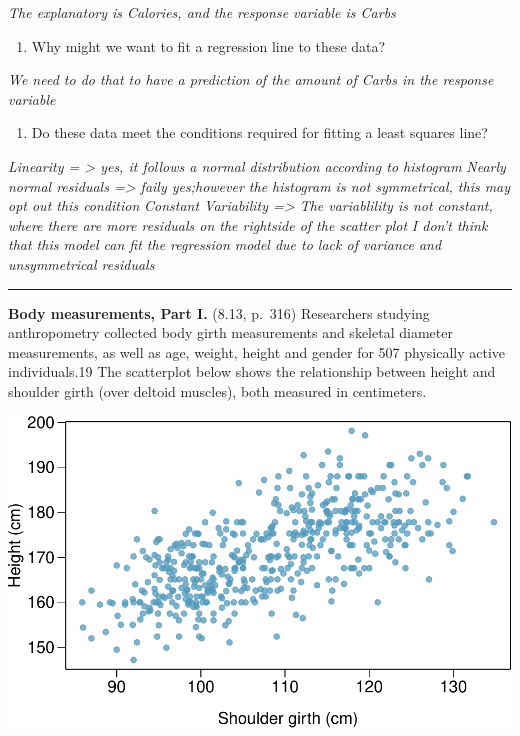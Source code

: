 \documentclass[]{article}
\providecommand{\tightlist}{%
  \setlength{\itemsep}{0pt}\setlength{\parskip}{0pt}}
\begin{document}
\emph{The explanatory is Calories, and the response variable is Carbs}

\begin{enumerate}
\def\labelenumi{(\alph{enumi})}
\setcounter{enumi}{2}
\tightlist
\item
  Why might we want to fit a regression line to these data?
\end{enumerate}

\emph{We need to do that to have a prediction of the amount of Carbs in
the response variable}

\begin{enumerate}
\def\labelenumi{(\alph{enumi})}
\setcounter{enumi}{3}
\tightlist
\item
  Do these data meet the conditions required for fitting a least squares
  line?
\end{enumerate}

\emph{Linearity = \textgreater{} yes, it follows a normal distribution
according to histogram} \emph{Nearly normal residuals =\textgreater{}
faily yes;however the histogram is not symmetrical, this may opt out
this condition} \emph{Constant Variability =\textgreater{} The
variablility is not constant, where there are more residuals on the
rightside of the scatter plot} \emph{I don't think that this model can
fit the regression model due to lack of variance and unsymmetrical
residuals}

\begin{center}\rule{0.5\linewidth}{\linethickness}\end{center}

\clearpage

\textbf{Body measurements, Part I.} (8.13, p.~316) Researchers studying
anthropometry collected body girth measurements and skeletal diameter
measurements, as well as age, weight, height and gender for 507
physically active individuals.19 The scatterplot below shows the
relationship between height and shoulder girth (over deltoid muscles),
both measured in centimeters.

\begin{center}

\includegraphics[width=0.5\linewidth]{Homework_8_files/figure-latex/unnamed-chunk-2-1} 
\end{center}
\end{document}
